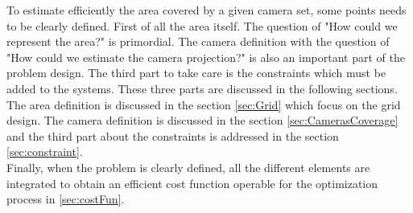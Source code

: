 To estimate efficiently the area covered by a given camera set, some points needs to be clearly defined.
First of all the area itself. The question of "How could we represent the area?" is  primordial. The camera definition  with the question of  "How could we estimate the camera projection?" is also an important part of the problem design.  The third part to take care is the constraints which must be added to the systems.
  These three parts are discussed in the following sections. The area definition is discussed in the section \ref{sec:Grid} which focus on the grid design. The camera definition is discussed in the section \ref{sec:CamerasCoverage} and the third part about the constraints is addressed in the section \ref{sec:constraint}.\\
Finally, when the problem is clearly defined, all the different elements are integrated to obtain an efficient cost function operable for the optimization process in \ref{sec:costFun}.

   
%
%
% 

